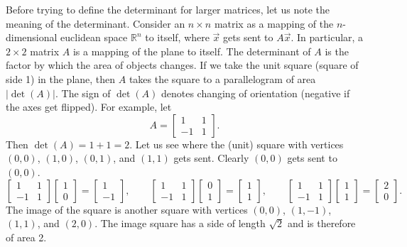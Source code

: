 Before trying to define the
determinant for larger matrices, let us note
the meaning of the determinant.  Consider an $n \times n$ matrix
as a mapping of the $n$-dimensional euclidean space ${\mathbb{R}}^n$ to 
itself, where $\vec{x}$ gets sent to $A \vec{x}$.
In particular, a $2 \times 2$ matrix $A$ is a mapping of
the plane to itself.  The
determinant of 
$A$ is the factor by which the area of objects changes. 
If we take the unit square (square of side 1) in the plane, then
$A$ takes the square to a parallelogram of area $\lvert\det(A)\rvert$.  The sign
of $\det(A)$ denotes changing of orientation (negative if the axes get flipped).  For
example, let
\begin{equation*}
A =
\begin{bmatrix}
1 & 1 \\
-1 & 1
\end{bmatrix} .
\end{equation*}
Then $\det(A) = 1+1 = 2$.  Let us see where the (unit) square with vertices
$(0,0)$, $(1,0)$, $(0,1)$, and $(1,1)$ gets sent.  Clearly $(0,0)$ gets sent
to $(0,0)$.  
\begin{equation*}
\begin{bmatrix}
1 & 1 \\
-1 & 1
\end{bmatrix}
\begin{bmatrix}
1 \\ 0
\end{bmatrix} =
\begin{bmatrix}
1 \\
-1 
\end{bmatrix}
,
\qquad
\begin{bmatrix}
1 & 1 \\
-1 & 1
\end{bmatrix}
\begin{bmatrix}
0 \\ 1
\end{bmatrix} =
\begin{bmatrix}
1 \\
1 
\end{bmatrix}
,
\qquad
\begin{bmatrix}
1 & 1 \\
-1 & 1
\end{bmatrix}
\begin{bmatrix}
1 \\ 1
\end{bmatrix} =
\begin{bmatrix}
2 \\
0 
\end{bmatrix}
.
\end{equation*}
The image of the square is another square with vertices $(0,0)$, $(1,-1)$,
$(1,1)$, and $(2,0)$.  The
image square has
a side of length $\sqrt{2}$ and is therefore of area 2.

